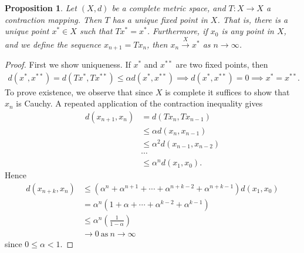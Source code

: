\documentclass[12pt,reqno]{amsart}
\numberwithin{equation}{section}  %
\newtheorem{proposition}[theorem]{Proposition}
\begin{document}
	\begin{proposition}
		\label{lem:fixed-point}
	Let $(X,d)$ be a complete metric space, and $T: X \to X$ a contraction
	mapping. Then $T$ has a unique fixed point in $X$. That is, there is a unique
	point $x^* \in X$ such that $Tx^* = x^*$. Furthermore, if $x_0$ is any point
  in $X$, and we define the sequence $x_{n+1} = Tx_n$, then $x_n \xrightarrow{X} x^*$ as $n
	\to \infty$.
	\end{proposition}
  \begin{proof} First we show uniqueness. If $x^*$ and $x^{**}$ are two fixed
	points, then
	\begin{equation*}
		\begin{split}
			d(x^*, x^{**}) = d(Tx^*, Tx^{**}) \le \alpha d(x^*, x^{**}) \implies d(x^*,
			x^{**}) = 0 \implies x^* = x^{**}.
		\end{split}
	\end{equation*}
To prove existence, we observe that since $X$ is complete it suffices to show
that $x_n$ is Cauchy. A repeated application of the
contraction inequality gives
%
%
\begin{equation*}
	\begin{split}
		d\left( x_{n+1},x_n \right)
		& = d\left( Tx_n, Tx_{n-1} \right)
		\\
		& \le \alpha d\left( x_n, x_{n-1} \right)
		\\
		& \le \alpha^2 d\left( x_{n-1}, x_{n-2} \right)
		\\
		& \cdots
		\\
		& \le \alpha^n d\left( x_1, x_0 \right).
	\end{split}
\end{equation*}
%
%
Hence
%
%
\begin{equation*}
\begin{split}
  d\left( x_{n+k},x_n \right)
  & \le (\alpha^{n } +\alpha^{n+1} + \cdots +
  \alpha^{n+k-2} + \alpha^{n+k-1})d(x_{1}, x_{0}) 
  \\
  & = \alpha^{n}(1 + \alpha + \cdots + \alpha^{k-2} + \alpha^{k-1})
  \\
  & \le \alpha^{n}\left( \frac{1}{1 - \alpha} \right)
  \\
  & \to 0 \ \text{as} \ n \to \infty
\end{split}
\end{equation*}
%
%
since $0 \le \alpha < 1$. 

\end{proof}
\end{document}
